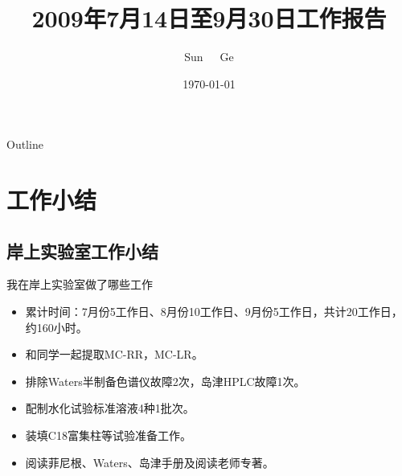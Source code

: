 \documentclass[CJKutf8]{beamer}
\newenvironment{SC}{%
  \CJKfamily{gbsn}%
  \CJKtilde
  \CJKnospace}{}
\begin{document}
\begin{CJK}{UTF8}{}
\begin{SC}

\title{2009年7月14日至9月30日工作报告}
\author{Sun~~~Ge}
\date{\today}

\begin{frame}
  \titlepage
\end{frame}

\begin{frame}{Outline}
  \tableofcontents
\end{frame}





\section{工作小结}

\subsection{岸上实验室工作小结}

\begin{frame}{我在岸上实验室做了哪些工作}%

  \begin{itemize}
  \item
    累计时间：7月份5工作日、8月份10工作日、9月份5工作日，共计20工作日，约160小时。
    \pause
  \item
    和同学一起提取MC-RR，MC-LR。
  \item
    排除Waters半制备色谱仪故障2次，岛津HPLC故障1次。
  \item
    配制水化试验标准溶液4种1批次。    
  \item
    装填C18富集柱等试验准备工作。
  \item
    阅读菲尼根、Waters、岛津手册及阅读老师专著。
  \end{itemize}


\end{frame}
\end{SC}
\end{CJK}
\end{document}
